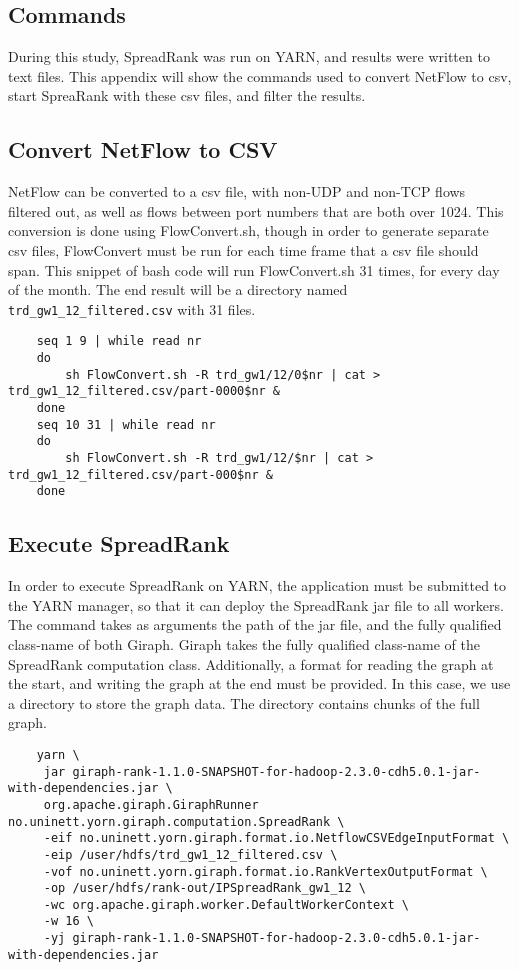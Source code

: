 \begin{landscape}
\chapter{Commands}

During this study,
SpreadRank was run on YARN, and results were written to text files.
This appendix will show the commands used to convert NetFlow to \gls{csv},
 start SpreaRank with these \gls{csv} files,
 and filter the results.

\newpage
\section{Convert NetFlow to CSV}
NetFlow can be converted to a \gls{csv} file, with non-UDP and non-TCP flows filtered out, as well as flows between port numbers that are both over 1024.
This conversion is done using FlowConvert.sh, though in order to generate separate \gls{csv} files, FlowConvert must be run for each time frame that a \gls{csv} file should span.
This snippet of \gls{bash} code will run FlowConvert.sh 31 times, for every day of the month.
The end result will be a directory named \verb"trd_gw1_12_filtered.csv" with 31 files.

\begin{verbatim}
	seq 1 9 | while read nr
	do
	    sh FlowConvert.sh -R trd_gw1/12/0$nr | cat > trd_gw1_12_filtered.csv/part-0000$nr &
	done
	seq 10 31 | while read nr
	do
	    sh FlowConvert.sh -R trd_gw1/12/$nr | cat > trd_gw1_12_filtered.csv/part-000$nr &
	done
\end{verbatim}

\newpage
\section{Execute SpreadRank}
In order to execute SpreadRank on YARN,
 the application must be submitted to the YARN manager,
 so that it can deploy the SpreadRank jar file to all workers.
The command takes as arguments the path of the jar file,
 and the fully qualified class-name of both Giraph.
Giraph takes the fully qualified class-name of the SpreadRank computation class.
Additionally, a format for reading the graph at the start, and writing the graph at the end must be provided.
In this case, we use a directory to store the graph data.
The directory contains chunks of the full graph.

\begin{verbatim}
	yarn \
	 jar giraph-rank-1.1.0-SNAPSHOT-for-hadoop-2.3.0-cdh5.0.1-jar-with-dependencies.jar \
	 org.apache.giraph.GiraphRunner no.uninett.yorn.giraph.computation.SpreadRank \
	 -eif no.uninett.yorn.giraph.format.io.NetflowCSVEdgeInputFormat \
	 -eip /user/hdfs/trd_gw1_12_filtered.csv \
	 -vof no.uninett.yorn.giraph.format.io.RankVertexOutputFormat \
	 -op /user/hdfs/rank-out/IPSpreadRank_gw1_12 \
	 -wc org.apache.giraph.worker.DefaultWorkerContext \
	 -w 16 \
	 -yj giraph-rank-1.1.0-SNAPSHOT-for-hadoop-2.3.0-cdh5.0.1-jar-with-dependencies.jar
\end{verbatim}



\end{landscape}
